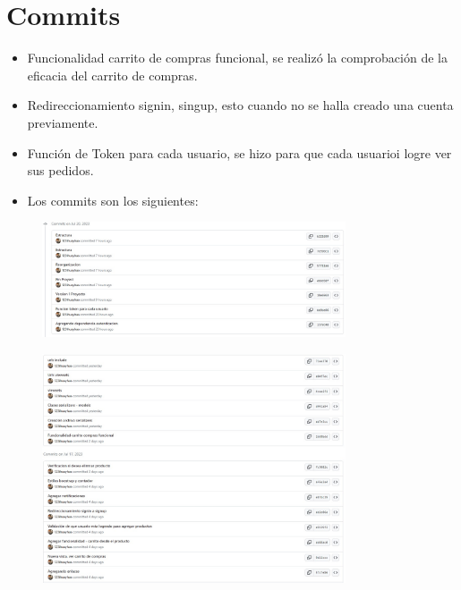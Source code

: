 \documentclass{article}
\begin{document}
    \section{Commits}
    \begin{itemize}
        \item Funcionalidad carrito de compras funcional, se realizó la comprobación de la eficacia del carrito de compras.
        \item Redireccionamiento signin, singup, esto cuando no se halla creado una cuenta previamente.
        \item Función de Token para cada usuario, se hizo para que cada usuarioi logre ver sus pedidos.
        \item Los commits son los siguientes:
    \end{itemize}
    \begin{figure}[H]
		      \centering
                \includegraphics[width=0.8\textwidth,keepaspectratio]{img/c1.jpeg}
	   \end{figure}
    \begin{figure}[H]
		      \centering
                \includegraphics[width=0.8\textwidth,keepaspectratio]{img/c2.jpeg}
	   \end{figure}
\end{document}
